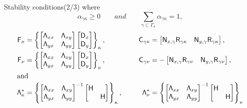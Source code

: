 \documentclass{beamer}
\begin{document}
\begin{frame}{Stability conditions(2/3)}
    where
    \begin{equation*}
    \alpha_{\gamma\kappa} \ge 0 \qquad and \qquad \sum_{\gamma\subset \Gamma_{\kappa}} \alpha_{\gamma\kappa} = 1,
    \end{equation*}
    \begin{alignat*}{2}
    \Gk &= \left\{ \begin{bmatrix} \Lamxx & \Lamxy \\ \Lamyx &
    \Lamyy \end{bmatrix} \begin{bmatrix} \Dx \\ \Dy \end{bmatrix} \right\}_{\kappa},
    &
    \setlength{\arraycolsep}{5pt}    
    \Cgk &= \begin{bmatrix} \Nxg \Rgk & \Nyg \Rgk \end{bmatrix}, \\
    \Gn &= \left\{ \begin{bmatrix} \Lamxx & \Lamxy \\ \Lamyx &
    \Lamyy \end{bmatrix} \begin{bmatrix} \Dx \\ \Dy \end{bmatrix} \right\}_{\nu},
    & 
    \setlength{\arraycolsep}{5pt}
    \Cgn &= - \begin{bmatrix} \Nxg \Rgn & \Nyg \Rgn \end{bmatrix}, \\
    \intertext{and}
    \Lam_{\kappa}^{*} &= \left\{ 
    \begin{bmatrix} \Lamxx & \Lamxy \\ \Lamyx & \Lamyy \end{bmatrix}^{-1}
    \begin{bmatrix} \H & \\ & \H \end{bmatrix} \right\}_{\kappa}, 
    & \qquad
    \Lam_{\nu}^{*} &= \left\{ 
    \begin{bmatrix} \Lamxx & \Lamxy \\ \Lamyx & \Lamyy \end{bmatrix}^{-1}
    \begin{bmatrix} \H & \\ & \H \end{bmatrix} \right\}_{\nu}
    \end{alignat*}
\end{frame}
\end{document}
